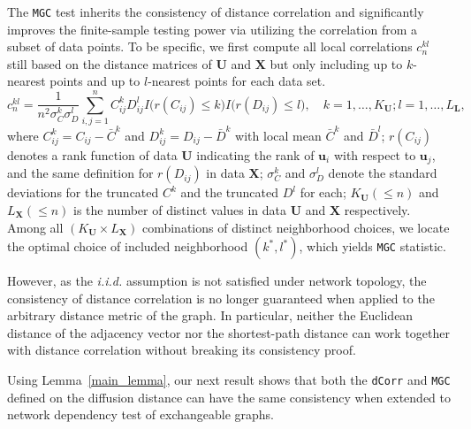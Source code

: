 \documentclass[11pt]{article}
\theoremstyle{definition}
\begin{document}
The \texttt{MGC} test inherits the consistency of distance correlation and significantly improves the finite-sample testing power via utilizing the correlation from a subset of data points. To be specific, we first compute all local correlations $c^{kl}_{n}$ still based on the distance matrices of $\mathbf{U}$ and $\mathbf{X}$ but only including up to $k$-nearest points and up to $l$-nearest points for each data set. 
\begin{equation}
\label{eq:MGC}
c^{kl}_{n} = \frac{1}{n^2 \sigma^{k}_{C} \sigma^{l}_{D}} \sum\limits_{i,j=1}^{n} C^{k}_{ij} D^{l}_{ij} I\big( r(C_{ij}) \leq k \big) I\big(  r(D_{ij}) \leq l  \big), \quad k= 1, \ldots, K_{\mathbf{U}}; l =1, \ldots, L_{\mathbf{L}},
\end{equation}
where $C^{k}_{ij} = C_{ij} - \bar{C}^{k}$ and $D^{k}_{ij} = D_{ij} - \bar{D}^{k}$ with local mean $\bar{C}^{k}$ and $\bar{D}^{l}$; $r(C_{ij})$ denotes a rank function of data $\mathbf{U}$ indicating the rank of $\mathbf{u}_{i}$ with respect to $\mathbf{u}_{j}$, and the same definition for $r(D_{ij})$ in data $\mathbf{X}$; $\sigma^{k}_{C}$ and $\sigma^{l}_{D}$ denote the standard deviations for the truncated $C^{k}$ and the truncated $D^{l}$ for each; $K_{\mathbf{U}} (\leq n)$ and $L_{\mathbf{X}} (\leq n)$ is the number of distinct values in data $\mathbf{U}$ and $\mathbf{X}$ respectively. Among all $( K_{\mathbf{U}} \times L_{\mathbf{X}} )$ combinations of distinct neighborhood choices, we locate the optimal choice of included neighborhood $(k^{*}, l^{*})$, which yields \texttt{MGC} statistic. 

However, as the \textit{i.i.d.} assumption is not satisfied under network topology, the consistency of distance correlation is no longer guaranteed when applied to the arbitrary distance metric of the graph. In particular, neither the Euclidean distance of the adjacency vector nor the shortest-path distance can work together with distance correlation without breaking its consistency proof. 

Using Lemma~\ref{main_lemma}, our next result shows that both the \texttt{dCorr} and \texttt{MGC} defined on the diffusion distance can have the same consistency when extended to network dependency test of exchangeable graphs.  
\end{document}
